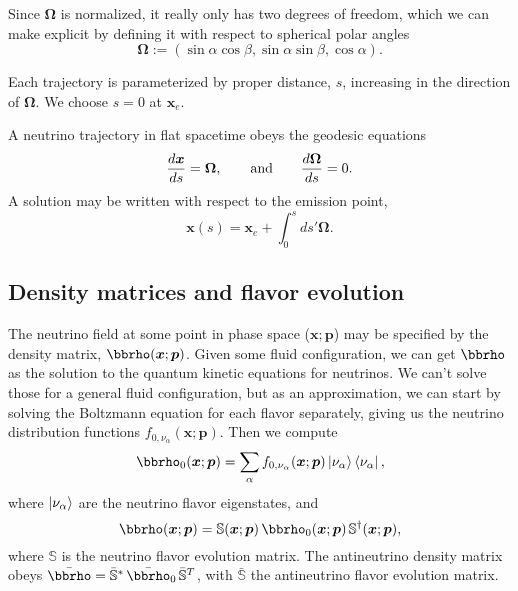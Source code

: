 \documentclass[aps,prd,twocolumn,superscriptaddress,groupedaddress]{revtex4}
\begin{document}
Since $\bm{\Omega}$ is normalized, it really only has two degrees of freedom,
which we can make explicit by defining it with respect to spherical polar
angles
\begin{equation}
  \label{eq:angle_def}
  \bm{\Omega} := (\sin\alpha\cos\beta,\sin\alpha\sin\beta,\cos\alpha).
\end{equation}

Each trajectory is parameterized by proper distance, $s$, increasing in
the direction of $\bm{\Omega}$. We choose $s=0$ at $\bm{x}_e$.

A neutrino trajectory in flat spacetime obeys the geodesic equations
\begin{align}
  \frac{d\bm{x}}{ds} = \bm{\Omega}, \qquad {\rm and} \qquad
  \frac{d\bm{\Omega}}{ds} = 0. \nonumber
\end{align}
A solution may be written with respect to the emission point,
\begin{equation}
  \label{eq:trajectory_x_solution_from_xe}
  \bm{x}(s) = \bm{x}_e + \int_{0}^{s}ds'\bm{\Omega}.
\end{equation}

\subsection*{Density matrices and flavor evolution}
The neutrino field at some point in phase space ($\bm{x};\bm{p}$)
may be specified by the density matrix, $\bbrho(\bm{x};\bm{p})$.
Given some fluid configuration, we can get $\bbrho$ as the solution to
the quantum kinetic equations for neutrinos.
We can't solve those for a general fluid configuration,
but as an approximation, we can start by solving the Boltzmann equation for each
flavor separately, giving us the neutrino distribution functions
$f_{0,\nu_\alpha}(\bm{x};\bm{p})$. Then we compute
\begin{equation}
  \label{eq:def_unoscillated_rho}
  \bbrho_0(\bm{x};\bm{p}) =
  \sum\limits_{\alpha}f_{0,\nu_\alpha}(\bm{x};\bm{p})
  \ket{\nu_\alpha} \bra{\nu_\alpha},
\end{equation}
where $\ket{\nu_\alpha}$ are the neutrino flavor eigenstates, and
\begin{equation}
  \label{eq:density_evolution}
  \bbrho(\bm{x};\bm{p}) =
  \mathbb{S}(\bm{x};\bm{p})\,
  \bbrho_0(\bm{x};\bm{p})\,
  \mathbb{S}^\dagger(\bm{x};\bm{p}),
\end{equation}
where $\mathbb{S}$ is the neutrino flavor evolution matrix.
The antineutrino density matrix obeys
$\bar{\bbrho} = \bar{\mathbb{S}}^*\,\bar{\bbrho}_0\,\bar{\mathbb{S}}^T$,
with $\bar{\mathbb{S}}$ the antineutrino flavor evolution matrix.
\end{document}
